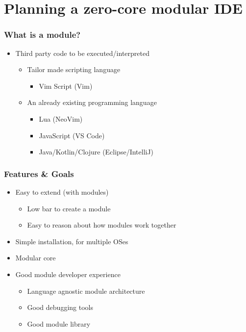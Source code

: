 \section{Planning a zero-core modular IDE}
\SectionPage

\begin{frame}
  \frametitle{What is a module?}
  \begin{itemize}
    \item Third party code to be executed/interpreted
      \pause
      \begin{itemize}
        \item Tailor made scripting language
          \pause
          \begin{itemize}
            \item Vim Script (Vim)
              \pause
          \end{itemize}
        \item An already existing programming language
          \pause
          \begin{itemize}
            \item Lua (NeoVim)
              \pause
            \item JavaScript (VS Code)
              \pause
            \item Java/Kotlin/Clojure (Eclipse/IntelliJ)
          \end{itemize}
      \end{itemize}
  \end{itemize}
\end{frame}

\begin{frame}
  \frametitle{Features \& Goals}
  \begin{itemize}
    \item Easy to extend (with modules)
      \pause
      \begin{itemize}
        \item Low bar to create a module
          \pause
        \item Easy to reason about how modules work together
          \pause
      \end{itemize}
    \item Simple installation, for multiple OSes
      \pause
    \item Modular core
      \pause
    \item Good module developer experience
      \begin{itemize}
          \pause
        \item Language agnostic module architecture
          \pause
        \item Good debugging tools
          \pause
        \item Good module library
      \end{itemize}
  \end{itemize}
\end{frame}